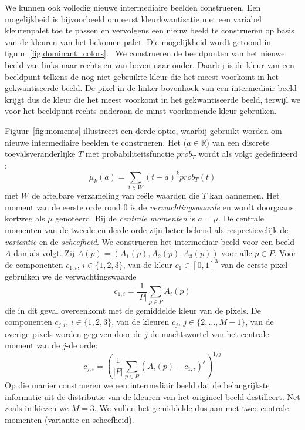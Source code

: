 We kunnen ook volledig nieuwe intermediaire beelden construeren. Een mogelijkheid is bijvoorbeeld om
eerst kleurkwantisatie met een variabel kleurenpalet toe te passen en vervolgens een
nieuw beeld te construeren op basis van de kleuren van het bekomen palet. Die mogelijkheid wordt getoond
in figuur~\ref{fig:dominant_colors}.  We construeren de beeldpunten 
van het nieuwe beeld van links naar rechts en van boven naar onder. Daarbij is de kleur van een beeldpunt 
telkens de nog niet gebruikte kleur die het meest voorkomt in het gekwantiseerde beeld. 
De pixel in de linker bovenhoek van een intermediair beeld krijgt dus de kleur die het meest voorkomt
in het gekwantiseerde beeld, terwijl we voor het beeldpunt rechts onderaan de minst voorkomende kleur
gebruiken. 

Figuur~\ref{fig:moments} illustreert een derde optie, waarbij  gebruikt
worden om nieuwe intermediaire beelden te construeren. Het  ($a
\in \mathbb{R}$) van een discrete toevalsveranderlijke $T$ met
probabiliteitsfunctie $prob_T$ wordt als volgt gedefinieerd
\cite{demeyer:statistiek}: 
\begin{displaymath}
\mu_k(a) = \sum_{t \in W} (t-a)^k prob_T(t)
\end{displaymath}
met $W$ de aftelbare verzameling van re\"ele waarden die $T$ kan aannemen. Het
moment
van de eerste orde rond $0$ is de \emph{verwachtingswaarde} en wordt doorgaans kortweg als
$\mu$ genoteerd. Bij de \emph{centrale momenten} is $a=\mu$. De centrale 
momenten van de tweede en derde orde zijn beter bekend als respectievelijk de
\emph{variantie} en de \emph{scheefheid}. We construeren het intermediair beeld
voor een beeld $A$ dan als volgt. Zij $A(p)=(A_1(p),A_2(p),A_3(p))$ voor
alle $p \in P$. Voor de componenten $c_{1,i}$, $i \in \{1,2,3\}$, van de
kleur $c_1 \in [0,1]^3$ van de eerste pixel gebruiken we de verwachtingswaarde
\begin{displaymath}
c_{1,i} = \frac{1}{|P|} \sum_{p \in P} A_i(p)  
\end{displaymath}
die in dit geval overeenkomt met de gemiddelde kleur van de pixels.
De componenten $c_{j,i}$, $i \in \{1,2,3\}$, van de kleuren $c_j$, $j \in
\{2,\ldots,M-1\}$, van de overige pixels worden gegeven door de $j$-de
machtswortel van het centrale moment van de $j$-de orde:
\begin{displaymath}
c_{j,i} = \left( \frac{1}{|P|} \sum_{p \in P} (A_i(p) - c_{1,i})^j \right)^{1/j}
\end{displaymath}
Op die manier construeren we een intermediair beeld dat de
belangrijkste informatie uit de distributie van de kleuren van het origineel beeld
destilleert. Net zoals in \cite{stricker:similarity_of_color_images} kiezen we 
$M = 3$. We vullen het gemiddelde dus aan met twee centrale momenten 
(variantie en scheefheid).

